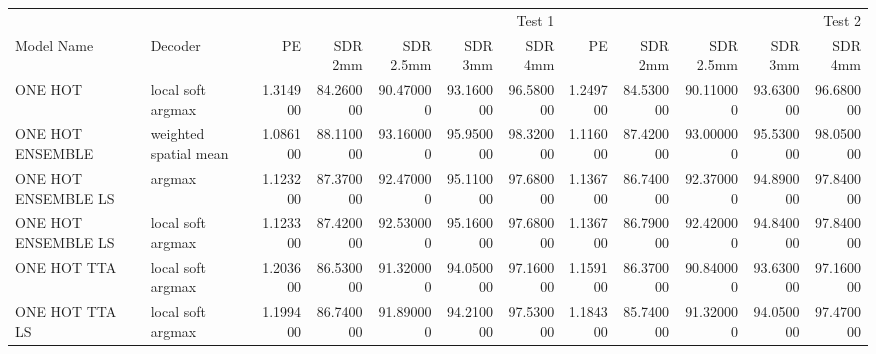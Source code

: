 \begin{tabular}{llrrrrrrrrrr}
\toprule
\multicolumn{2}{r}{} & \multicolumn{5}{r}{Test 1} & \multicolumn{5}{r}{Test 2} \\
Model Name & Decoder & PE & SDR 2mm & SDR 2.5mm & SDR 3mm & SDR 4mm & PE & SDR 2mm & SDR 2.5mm & SDR 3mm & SDR 4mm \\
\midrule
ONE HOT & local soft argmax & 1.314900 & 84.260000 & 90.470000 & 93.160000 & 96.580000 & 1.249700 & 84.530000 & 90.110000 & 93.630000 & 96.680000 \\
ONE HOT ENSEMBLE & weighted spatial mean & 1.086100 & 88.110000 & 93.160000 & 95.950000 & 98.320000 & 1.116000 & 87.420000 & 93.000000 & 95.530000 & 98.050000 \\
ONE HOT ENSEMBLE LS & argmax & 1.123200 & 87.370000 & 92.470000 & 95.110000 & 97.680000 & 1.136700 & 86.740000 & 92.370000 & 94.890000 & 97.840000 \\
ONE HOT ENSEMBLE LS & local soft argmax & 1.123300 & 87.420000 & 92.530000 & 95.160000 & 97.680000 & 1.136700 & 86.790000 & 92.420000 & 94.840000 & 97.840000 \\
ONE HOT TTA & local soft argmax & 1.203600 & 86.530000 & 91.320000 & 94.050000 & 97.160000 & 1.159100 & 86.370000 & 90.840000 & 93.630000 & 97.160000 \\
ONE HOT TTA LS & local soft argmax & 1.199400 & 86.740000 & 91.890000 & 94.210000 & 97.530000 & 1.184300 & 85.740000 & 91.320000 & 94.050000 & 97.470000 \\
\bottomrule
\end{tabular}
